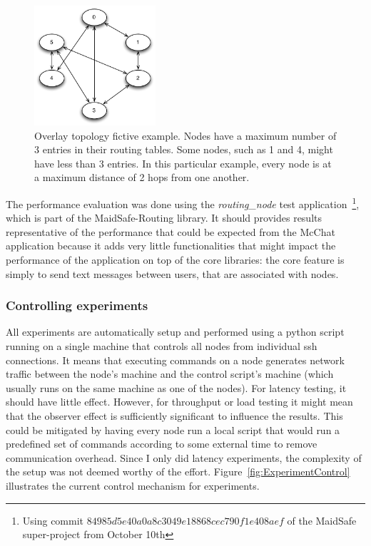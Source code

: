 \begin{figure}[htb]
\begin{center}
\includegraphics[width=0.4\textwidth]{figures/OverlayTopology}
\caption[Overlay topology fictive example.]{\label{fig:OverlayTopology} Overlay topology fictive example. Nodes have a maximum number of 3 entries in their routing tables. Some nodes, such as 1 and 4, might have less than 3 entries. In this particular example, every node is at a maximum distance of 2 hops from one another.}
\end{center}
\end{figure}

The performance evaluation was done using the \textit{routing\_node} test application~\footnote{Using commit $84985d5e40a0a8c3049e18868cec790f1e408aef$ of the MaidSafe super-project from October 10th}, which is part of the MaidSafe-Routing library. It should provides results representative of the performance that could be expected from the McChat application because it adds very little functionalities that might impact the performance of the application on top of the core libraries: the core feature is simply to send text messages between users, that are associated with nodes. 

\subsubsection{Controlling experiments}

All experiments are automatically setup and performed using a python script running on a single machine that controls all nodes from individual ssh connections. It means that executing commands on a node generates network traffic between the node's machine and the control script's machine (which usually runs on the same machine as one of the nodes). For latency testing, it should have little effect. However, for throughput or load testing it might mean that the observer effect is sufficiently significant to influence the results. This could be mitigated by having every node run a local script that would run a predefined set of commands according to some external time to remove communication overhead. Since I only did latency experiments, the complexity of the setup was not deemed worthy of the effort. Figure~\ref{fig:ExperimentControl} illustrates the current control mechanism for experiments.

